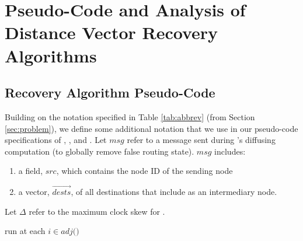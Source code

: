 
\chapter{Pseudo-Code and Analysis of Distance Vector Recovery Algorithms}
\label{ch:appendix-rollback}

\section{Recovery Algorithm Pseudo-Code}
\label{sec:appendix-rollback-code}

Building on the notation specified in Table \ref{tab:abbrev} (from Section \ref{sec:problem}), we define some additional notation that we use in our pseudo-code 
specifications of \seconds, \purges, and \cprs.
Let $msg$ refer to a message sent during \purges's diffusing computation (to globally remove false routing state). $msg$ includes:
\begin{enumerate}

	\item a field, $src$, which contains the node ID of the sending node 
	\item a vector, $\overrightarrow{dests}$, of all destinations that include \bad as an intermediary node. 

\end{enumerate}
Let $\Delta$ refer to the maximum clock skew for \cprs. %


\begin{algorithm}
\caption{\second  run at each $i \in adj($\bads$)$} 
\label{alg:second}

\begin{algorithmic}[1]

	\ENDIF
\ENDFOR
	\ENDIF

\end{algorithmic}
\end{algorithm}




